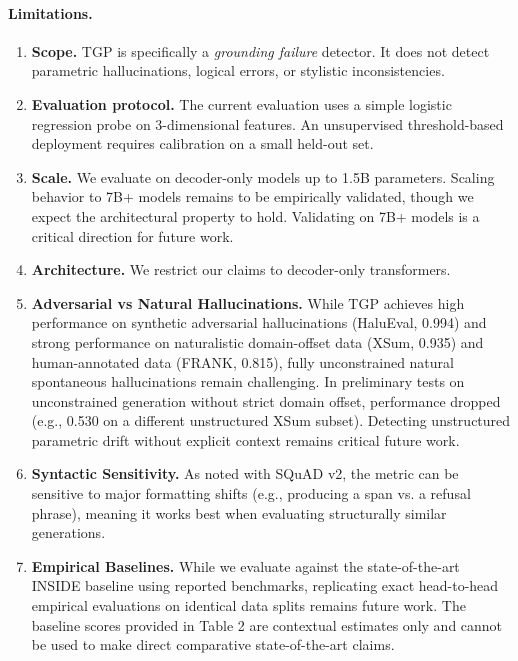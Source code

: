 \documentclass[10pt]{article}
\newcommand{\tgp}{\textsc{TGP}\xspace}
\begin{document}
\paragraph{Limitations.}
\begin{enumerate}[nosep,leftmargin=*]
    \item \textbf{Scope.} \tgp is specifically a \emph{grounding failure} detector. It does not detect parametric hallucinations, logical errors, or stylistic inconsistencies.
    \item \textbf{Evaluation protocol.} The current evaluation uses a simple logistic regression probe on 3-dimensional features. An unsupervised threshold-based deployment requires calibration on a small held-out set.
    \item \textbf{Scale.} We evaluate on decoder-only models up to 1.5B parameters. Scaling behavior to 7B+ models remains to be empirically validated, though we expect the architectural property to hold. Validating on 7B+ models is a critical direction for future work.
    \item \textbf{Architecture.} We restrict our claims to decoder-only transformers.
    \item \textbf{Adversarial vs Natural Hallucinations.} While TGP achieves high performance on synthetic adversarial hallucinations (HaluEval, 0.994) and strong performance on naturalistic domain-offset data (XSum, 0.935) and human-annotated data (FRANK, 0.815), fully unconstrained natural spontaneous hallucinations remain challenging. In preliminary tests on unconstrained generation without strict domain offset, performance dropped (e.g., 0.530 on a different unstructured XSum subset). Detecting unstructured parametric drift without explicit context remains critical future work.
    \item \textbf{Syntactic Sensitivity.} As noted with SQuAD v2, the metric can be sensitive to major formatting shifts (e.g., producing a span vs. a refusal phrase), meaning it works best when evaluating structurally similar generations.
    \item \textbf{Empirical Baselines.} While we evaluate against the state-of-the-art INSIDE baseline using reported benchmarks, replicating exact head-to-head empirical evaluations on identical data splits remains future work. The baseline scores provided in Table 2 are contextual estimates only and cannot be used to make direct comparative state-of-the-art claims.
    
\end{enumerate}
\end{document}
